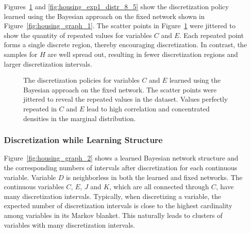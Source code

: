 \begin{table}
  \centering
  \caption{
    Discretization policy summary of the Housing dataset based on the fixed network structure shown.
    The first twelve rows show the numbers of discretization intervals and the last row is the mean cross-validated log-likelihood.%
  }
  
  \label{table:housing_disc_table_1}
\end{table}

Figures~\ref{fig:housing_exp1_distr_3_5} and \ref{fig:housing_exp1_distr_8_5} show the discretization policy learned using the Bayesian approach on the fixed network shown in Figure~\ref{fig:housing_graph_1}.
The scatter points in Figure~\ref{fig:housing_exp1_distr_3_5} were jittered to show the quantity of repeated values for variables $C$ and $E$.
Each repeated point forms a single discrete region, thereby encouraging discretization.
In contrast, the samples for $H$ are well spread out, resulting in fewer discretization regions and larger discretization intervals.

\begin{figure}[ht]
  \centering
  
  \caption{
    The discretization policies for variables $C$ and $E$ learned using the Bayesian approach on the fixed network.
    The scatter points were jittered to reveal the repeated values in the dataset.
    Values perfectly repeated in $C$ and $E$ lead to high correlation and concentrated densities in the marginal distribution.
  }
  \label{fig:housing_exp1_distr_3_5}
\end{figure}

\subsubsection{Discretization while Learning Structure}
\label{subsubsec:housing_exp2}

Figure~\ref{fig:housing_graph_2} shows a learned Bayesian network structure and the corresponding numbers of intervals after discretization for each continuous variable.
Variable $D$ is neighborless in both the learned and fixed networks.
The continuous variables $C$, $E$, $J$ and $K$, which are all connected through $C$, have many discretization intervals.
Typically, when discretizing a variable, the expected number of discretization intervals is close to the highest cardinality among variables in its Markov blanket.
This naturally leads to clusters of variables with many discretization intervals.

